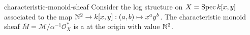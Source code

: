 \begin{example}{characteristic-monoid-sheaf}
    Consider the log structure on $X = \operatorname{Spec} k[x, y]$ associated to the map $\mathbb{N}^2 \to k[x, y] : (a, b) \mapsto x^a y^b$. The characteristic monoid sheaf $\overline{M} = \mathcal{M} / \alpha^{-1} \mathcal{O}_X^*$ is a  at the origin with value $\mathbb{N}^2$.
\end{example}
